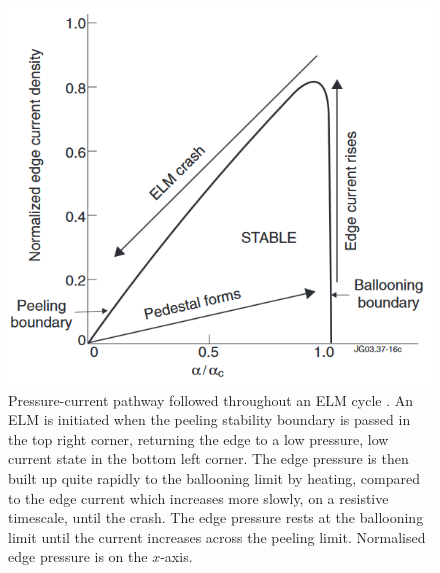 \documentclass[11pt, twocolumn]{article}  %
\begin{document}
\begin{figure}
\includegraphics[scale=0.5]{Figures/ELMcrash.PNG}
\centering
\caption{Pressure-current pathway followed throughout an ELM cycle \cite{Perez2004}. An ELM is initiated when the peeling stability boundary is passed in the top right corner, returning the edge to a low pressure, low current state in the bottom left corner. The edge pressure is then built up quite rapidly to the ballooning limit by heating, compared to the edge current which increases more slowly, on a resistive timescale, until the crash. The edge pressure rests at the ballooning limit until the current increases across the peeling limit. Normalised edge pressure is on the $x$-axis.}\label{fig:PBcrash}
\end{figure}
\end{document}
